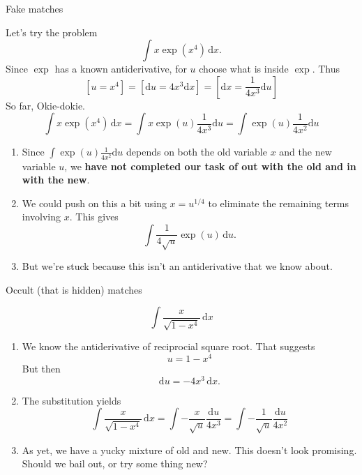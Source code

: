 \documentclass[fleqn]{beamer}
\theoremstyle{definition}
\newenvironment{checklist}{
  \begin{enumerate}[\ding{51}]
    \addtolength{\itemsep}{-0.0\itemsep}}
  {\end{enumerate}}
\begin{document}
\begin{frame}{Fake  matches}

Let's try the problem
\[
   \int  x \exp(x^4) \, \mathrm{d} x.
\]
Since \(\exp\) has a known antiderivative, for \(u\) choose what is inside \(\exp\). Thus
\[
   [u = x^4 ] = [\mathrm{d} u = 4 x^3 \mathrm{d} x] = \left[   \mathrm{d} x =  \frac{1}{4 x^3} \mathrm{d} u \right]
\]
So far, Okie-dokie.
\[
   \int  x \exp(x^4) \, \mathrm{d} x = \int x \exp(u)  \frac{1}{4 x^3} \mathrm{d} u = \int  \exp(u)  \frac{1}{4 x^2} \mathrm{d} u
\]

\begin{checklist}

\item Since   \(\int  \exp(u)  \frac{1}{4 x^2} \mathrm{d} u \) depends on both the old variable \(x\) and the new variable \(u\), we \textbf{have not completed our task of out with the old and in with the new}.

\item We could push on this a bit using \(x = u^{1/4} \) to eliminate the remaining terms involving \(x\). This gives
\[
    \int \frac{1}{4 \sqrt{u}} \exp(u) \, \mathrm{d} u.
\]

\item But we're stuck because this isn't an antiderivative that we know about.
\end{checklist}

\end{frame}


\begin{frame}{Occult  (that is hidden) matches}

\[
    \int  \frac{x}{\sqrt{1-x^4}} \, \mathrm{d} x
\]


\begin{checklist}

\item We know the antiderivative of reciprocial square root. That suggests
\[
    u  = 1-x^4
\]
But then
\[
    \mathrm{d} u = - 4 x^3 \, \mathrm{d} x.
\]
\item The substitution yields
\[
   \int  \frac{x}{\sqrt{1-x^4}} \, \mathrm{d} x = \int   -   \frac{x}{\sqrt{u}} \frac{\mathrm{d} u}{4 x^3}  =  \int   -   \frac{1}{\sqrt{u}} \frac{\mathrm{d} u}{4 x^2}  
\] 

\item As yet, we have a yucky mixture of old and new.  This doesn't look promising.  Should we bail out, or try some thing new? 
\end{checklist}
\end{frame} 
\end{document}
